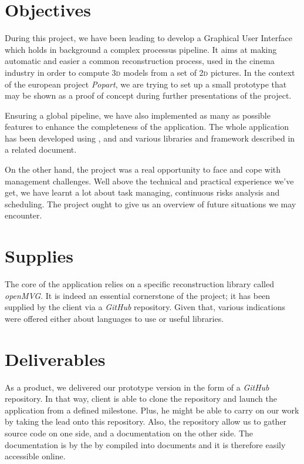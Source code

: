 \section{Objectives}
During this project, we have been leading to develop a Graphical User Interface 
which holds in background a complex processus pipeline. It aims at making automatic
and easier a common reconstruction process, used in the cinema industry in order
to compute \textsc{3d} models from a set of \textsc{2d} pictures. In the context
of the european project \emph{Popart},  we are trying to set up a small prototype
that may be shown as a proof of concept during further presentations of the project.

\noindent
Ensuring a global pipeline, we have also implemented as many as possible features
to enhance the completeness of the application. The whole application has been
developed using ,  and  and various libraries 
and framework described in a related document. 

\noindent 
On the other hand, the project was a real opportunity to face and cope with 
management challenges. Well above the technical and practical experience we've get, 
we have learnt a lot about task managing, continuous risks analysis and scheduling.
The project ought to give us an overview of future situations we may encounter.  

\section{Supplies}
The core of the application relies on a specific reconstruction library called 
\emph{openMVG}. It is indeed an essential cornerstone of the project; it has 
been supplied by the client via a \emph{GitHub} repository. Given that, various 
indications were offered either about languages to use or useful libraries.

\section{Deliverables}
As a product, we delivered our prototype version in the form of a \emph{GitHub} 
repository. In that way, client is able to clone the repository and launch the 
application from a defined milestone. Plus, he might be able to carry on our 
work by taking the lead onto this repository. 
Also, the repository allow us to gather source code on one side, and a documentation
on the other side. The documentation is by the by compiled into  
documents and it is therefore easily accessible online. 

